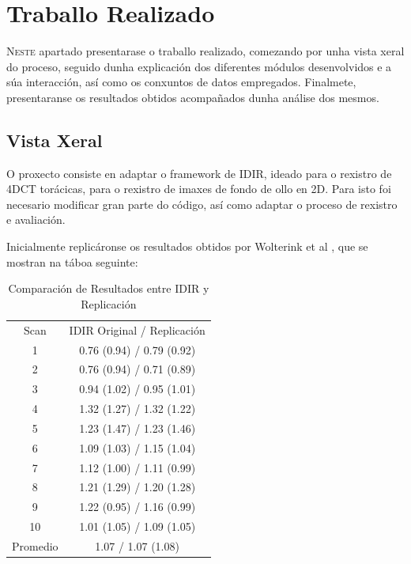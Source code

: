 \chapter{Traballo Realizado}
\label{chap:Traballo Realizado}

\lettrine{N}{este} apartado presentarase o traballo realizado, comezando por unha vista xeral do proceso, 
seguido dunha explicación dos diferentes módulos desenvolvidos e a súa interacción, así como os conxuntos de datos empregados.
Finalmete, presentaranse os resultados obtidos acompañados dunha análise dos mesmos.
\section{Vista Xeral}
\label{sec:VistaXeral}

O proxecto consiste en adaptar o framework de IDIR, ideado para o rexistro de \gls{4DCT} torácicas, para o rexistro de imaxes de fondo de ollo en 2D.
Para isto foi necesario modificar gran parte do código, así como adaptar o proceso de rexistro e avaliación.

Inicialmente replicáronse os resultados obtidos por Wolterink et al \cite{wolterink2021implicit}, que se mostran na táboa seguinte:

\begin{table}[ht]
    \centering
    \caption{Comparación de Resultados entre IDIR y Replicación}
    \begin{tabular}{c|c}
        Scan & {IDIR Original / Replicación} \\
        1  & 0.76 (0.94) / 0.79 (0.92) \\
        2  & 0.76 (0.94) / 0.71 (0.89) \\
        3  & 0.94 (1.02) / 0.95 (1.01) \\
        4  & 1.32 (1.27) / 1.32 (1.22) \\
        5  & 1.23 (1.47) / 1.23 (1.46) \\
        6  & 1.09 (1.03) / 1.15 (1.04) \\
        7  & 1.12 (1.00) / 1.11 (0.99) \\
        8  & 1.21 (1.29) / 1.20 (1.28) \\
        9  & 1.22 (0.95) / 1.16 (0.99) \\
        10 & 1.01 (1.05) / 1.09 (1.05) \\
        Promedio & 1.07 / 1.07 (1.08) \\
    \end{tabular}
    \label{tab:comparison}
\end{table}

